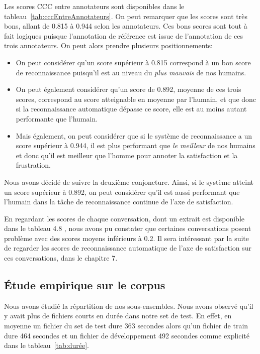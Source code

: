 Les scores CCC entre annotateurs sont disponibles dans le tableau~\ref{tab:cccEntreAnnotateurs}. On peut remarquer que les scores sont très bons, allant de 0.815 à 0.944 selon les annotateurs. Ces bons scores sont tout à fait logiques puisque l'annotation de référence est issue de l'annotation de ces trois annotateurs. On peut alors prendre plusieurs positionnements:
\begin{itemize}
  \item On peut considérer qu'un score supérieur à 0.815 correspond à un bon score de reconnaissance puisqu'il est au niveau du \textit{plus mauvais} de nos humains.
  \item On peut également considérer qu'un score de 0.892, moyenne de ces trois scores, correspond au score atteignable en moyenne par l'humain, et que donc si la reconnaissance automatique dépasse ce score, elle est au moins autant performante que l'humain.
  \item Mais également, on peut considérer que si le système de reconnaissance a un score supérieur à 0.944, il est plus performant que \textit{le meilleur} de nos humains et donc qu'il est meilleur que l'homme pour annoter la satisfaction et la frustration.
\end{itemize}

Nous avons décidé de suivre la deuxième conjoncture. Ainsi, si le système atteint un score supérieur à 0.892, on peut considérer qu'il est aussi performant que l'humain dans la tâche de reconnaissance continue de l'axe de satisfaction.

En regardant les scores de chaque conversation, dont un extrait est disponible dans le tableau 4.8
, nous avons pu constater que certaines conversations posent problème avec des scores moyens inférieurs à 0.2. Il sera intéressant par la suite de regarder les scores de reconnaissance automatique de l'axe de satisfaction sur ces conversations, dans le chapitre 7.%



\subsection{Étude empirique sur le corpus}

Nous avons étudié la répartition de nos sous-ensembles. Nous avons observé qu'il y avait plus de fichiers courts en durée dans notre set de test. En effet, en moyenne un fichier du set de test dure 363 secondes alors qu'un fichier de train dure 464 secondes et un fichier de développement 492 secondes comme explicité dans le tableau~\ref{tab:durée}.


